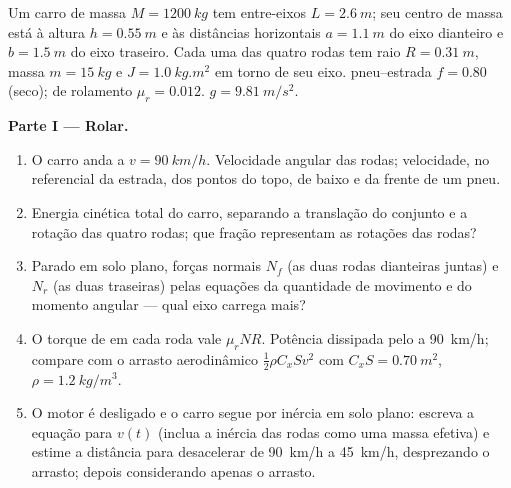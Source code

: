 \begin{problem}
\label{pb:b2:rigid-body-mechanics:1}

Um carro de massa $M = \qty{1200}{kg}$ tem entre-eixos $L = \qty{2.6}{m}$; seu
centro de massa está à altura $h = \qty{0.55}{m}$ e às distâncias horizontais
$a = \qty{1.1}{m}$ do eixo dianteiro e $b = \qty{1.5}{m}$ do eixo
traseiro. Cada uma das quatro rodas tem raio $R = \qty{0.31}{m}$, massa $m =
\qty{15}{kg}$ e  $J = \qty{1.0}{kg.m^2}$ em torno de seu eixo.
 pneu--estrada $f = 0.80$ (seco);  de rolamento $\mu_r = 0.012$. $g = \qty{9.81}{m/s^2}$.

\medskip
\noindent\textbf{Parte I --- Rolar.}
\begin{enumerate}
  \item O carro anda a $v = \qty{90}{km/h}$. Velocidade angular das
        rodas; velocidade, no referencial da estrada, dos pontos do
        topo, de baixo e da frente de um pneu.
  \item Energia cinética total do carro, separando a translação do
        conjunto e a rotação das quatro rodas; que fração representam
        as rotações das rodas?
  \item Parado em solo plano, forças normais $N_f$ (as duas rodas
        dianteiras juntas) e $N_r$ (as duas traseiras) pelas equações da
        quantidade de movimento e do momento angular --- qual eixo
        carrega mais?
  \item O torque de  em cada roda vale $\mu_rNR$. Potência
        dissipada pelo  a \qty{90}{km/h}; compare com
        o arrasto aerodinâmico $\tfrac12\rho C_xSv^2$ com $C_xS =
        \qty{0.70}{m^2}$, $\rho = \qty{1.2}{kg/m^3}$.
  \item O motor é desligado e o carro segue por inércia em solo plano: escreva a
        equação para $v(t)$ (inclua a inércia das rodas como uma massa
        efetiva) e estime a distância para desacelerar de \qty{90}{km/h} a
        \qty{45}{km/h}, desprezando o arrasto; depois considerando apenas o arrasto.
\end{enumerate}


\end{problem}
